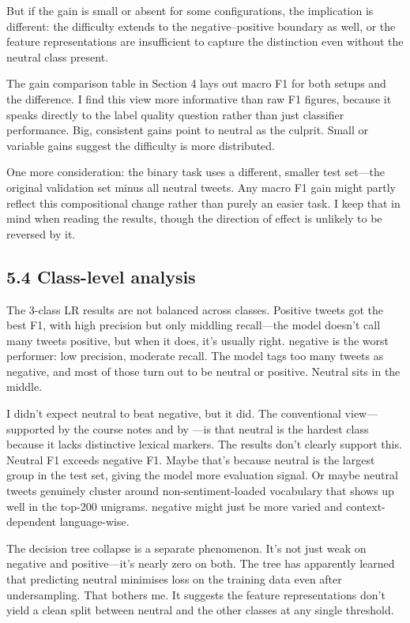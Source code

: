 \documentclass[12pt]{article}
\begin{document}
But if the gain is small or absent for some configurations, the implication is different: the difficulty extends to the negative--positive boundary as well, or the feature representations are insufficient to capture the distinction even without the neutral class present.

The gain comparison table in Section 4 lays out macro F1 for both setups and the difference. I find this view more informative than raw F1 figures, because it speaks directly to the label quality question rather than just classifier performance. Big, consistent gains point to neutral as the culprit. Small or variable gains suggest the difficulty is more distributed.

One more consideration: the binary task uses a different, smaller test set---the original validation set minus all neutral tweets. Any macro F1 gain might partly reflect this compositional change rather than purely an easier task. I keep that in mind when reading the results, though the direction of effect is unlikely to be reversed by it.



\subsection*{5.4 Class-level analysis}



The 3-class LR results are not balanced across classes. Positive tweets got the best F1, with high precision but only middling recall---the model doesn't call many tweets positive, but when it does, it's usually right. negative is the worst performer: low precision, moderate recall. The model tags too many tweets as negative, and most of those turn out to be neutral or positive. Neutral sits in the middle.

I didn't expect neutral to beat negative, but it did. The conventional view---supported by the course notes and by \citet{kenyondean2018sentiment}---is that neutral is the hardest class because it lacks distinctive lexical markers. The results don't clearly support this. Neutral F1 exceeds negative F1. Maybe that's because neutral is the largest group in the test set, giving the model more evaluation signal. Or maybe neutral tweets genuinely cluster around non-sentiment-loaded vocabulary that shows up well in the top-200 unigrams. negative might just be more varied and context-dependent language-wise.

The decision tree collapse is a separate phenomenon. It's not just weak on negative and positive---it's nearly zero on both. The tree has apparently learned that predicting neutral minimises loss on the training data even after undersampling. That bothers me. It suggests the feature representations don't yield a clean split between neutral and the other classes at any single threshold.
\end{document}
